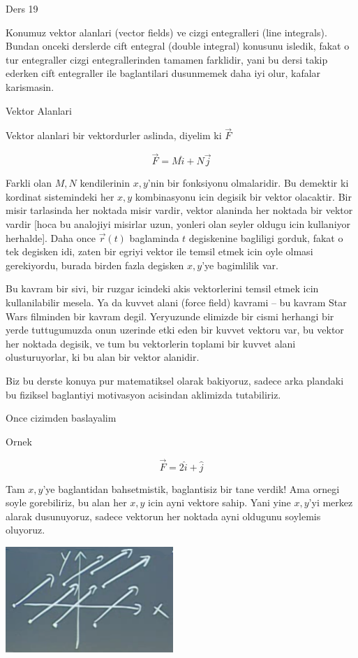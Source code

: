 \documentclass[12pt,fleqn]{article}\usepackage{../common}
\begin{document}
Ders 19

Konumuz vektor alanlari (vector fields) ve cizgi entegralleri (line
integrals). Bundan onceki derslerde cift entegral (double integral)
konusunu isledik, fakat o tur entegraller cizgi entegrallerinden tamamen
farklidir, yani bu dersi takip ederken cift entegraller ile baglantilari
dusunmemek daha iyi olur, kafalar karismasin. 

Vektor Alanlari

Vektor alanlari bir vektordurler aslinda, diyelim ki $\vec{F}$

\[ \vec{F} = M\hat{i} + N\vec{j} \]

Farkli olan $M,N$ kendilerinin $x,y$'nin bir fonksiyonu olmalaridir. Bu
demektir ki kordinat sistemindeki her $x,y$ kombinasyonu icin degisik bir
vektor olacaktir. Bir misir tarlasinda her noktada misir vardir, vektor
alaninda her noktada bir vektor vardir [hoca bu analojiyi misirlar uzun,
yonleri olan seyler oldugu icin kullaniyor herhalde]. Daha once
$\vec{r}(t)$ baglaminda $t$ degiskenine bagliligi gorduk, fakat o tek
degisken idi, zaten bir egriyi vektor ile temsil etmek icin oyle olmasi
gerekiyordu, burada birden fazla degisken $x,y$'ye bagimlilik var. 

Bu kavram bir sivi, bir ruzgar icindeki akis vektorlerini temsil etmek icin
kullanilabilir mesela. Ya da kuvvet alani (force field) kavrami -- bu
kavram Star Wars filminden bir kavram degil. Yeryuzunde elimizde bir cismi
herhangi bir yerde tuttugumuzda onun uzerinde etki eden bir kuvvet vektoru
var, bu vektor her noktada degisik, ve tum bu vektorlerin toplami bir
kuvvet alani olusturuyorlar, ki bu alan bir vektor alanidir. 

Biz bu derste konuya pur matematiksel olarak bakiyoruz, sadece arka
plandaki bu fiziksel baglantiyi motivasyon acisindan aklimizda
tutabiliriz. 

Once cizimden baslayalim

Ornek

\[ \vec{F} = 2\hat{i} + \hat{j} \]

Tam $x,y$'ye baglantidan bahsetmistik, baglantisiz bir tane verdik! Ama
ornegi soyle gorebiliriz, bu alan her $x,y$ icin ayni vektore sahip. Yani
yine $x,y$'yi merkez alarak dusunuyoruz, sadece vektorun her noktada ayni
oldugunu soylemis oluyoruz.

\includegraphics[height=4cm]{19_1.png}
\end{document}
